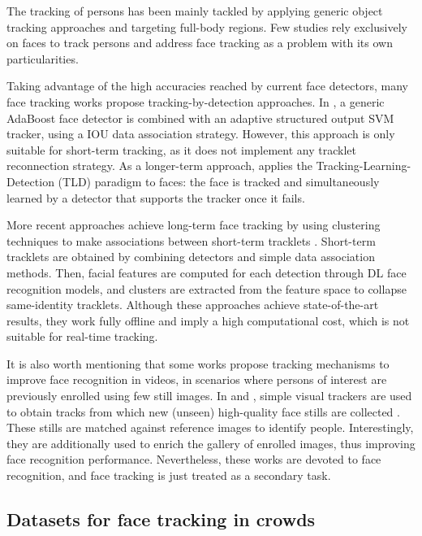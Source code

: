 The tracking of persons has been mainly tackled by applying generic object tracking approaches and targeting full-body regions. Few studies rely exclusively on faces to track persons and address face tracking as a problem with its own particularities. 

Taking advantage of the high accuracies reached by current face detectors, many face tracking works propose tracking-by-detection approaches. In \cite{comaschi2015online}, a generic AdaBoost face detector is combined with an adaptive structured output SVM tracker, using a IOU data association strategy. However, this approach is only suitable for short-term tracking, as it does not implement any tracklet reconnection strategy. 
As a longer-term approach, \cite{kalal2010face} applies the Tracking-Learning-Detection (TLD) paradigm to faces: the face is tracked and simultaneously learned by a detector that supports the tracker once it fails. 

More recent approaches achieve long-term face tracking by using clustering techniques to make associations between short-term tracklets \cite{lin2018offline, zhang2016offline}. Short-term tracklets are obtained by combining detectors and simple data association methods. Then, facial features are computed for each detection through DL face recognition models, and clusters are extracted from the feature space to collapse same-identity tracklets. Although these approaches achieve state-of-the-art results, they work fully offline and imply a high computational cost, which is not suitable for real-time tracking.

It is also worth mentioning that some works propose tracking mechanisms to improve face recognition in videos, in scenarios where persons of interest are previously enrolled using few still images. 
In \cite{dewan2016adaptive} and \cite{zheng2018automatic}, simple visual trackers are used to obtain tracks from which new (unseen) high-quality face stills are collected \cite{dewan2016adaptive}. These stills are matched against reference images to identify people. Interestingly, they are additionally used to enrich the gallery of enrolled images, thus improving face recognition performance. 
Nevertheless, these works are devoted to face recognition, and face tracking is just treated as a secondary task. 


\subsection{Datasets for face tracking in crowds}
\label{sec:public_datasets}

